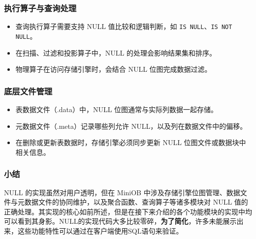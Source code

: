\documentclass[a4paper, 12pt]{article}
\begin{document}
\subsubsection{执行算子与查询处理}
\begin{itemize}
    \item 查询执行算子需要支持 NULL 值比较和逻辑判断，如 \texttt{IS NULL}、\texttt{IS NOT NULL}。
    \item 在扫描、过滤和投影算子中，NULL 的处理会影响结果集和排序。
    \item 物理算子在访问存储引擎时，会结合 NULL 位图完成数据过滤。
\end{itemize}

\subsubsection{底层文件管理}
\begin{itemize}
    \item 表数据文件（.data）中，NULL 位图通常与实际列数据一起存储。
    \item 元数据文件（.meta）记录哪些列允许 NULL，以及列在数据文件中的偏移。
    \item 在删除或更新表数据时，存储引擎必须同步更新 NULL 位图文件或数据块中相关信息。
\end{itemize}

\subsubsection{小结}
NULL 的实现虽然对用户透明，但在 MiniOB 中涉及存储引擎位图管理、数据文件与元数据文件的协同维护，以及聚合函数、查询算子等诸多模块对 NULL 值的正确处理。其实现的核心如前所述，但是在接下来介绍的各个功能模块的实现中均可以看到其身影。NULL的实现代码大多比较零碎，\textbf{\heiti 为了简化}，许多未能展示出来，这些功能特性可以通过在客户端使用SQL语句来验证。
\end{document}
